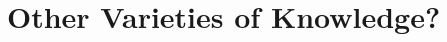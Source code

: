 ﻿\documentclass[11pt]{amsart}
\begin{document}












\section{Other Varieties of Knowledge?}
\end{document}
